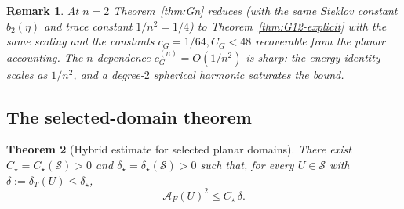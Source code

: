 \documentclass[11pt]{amsart}
\newtheorem{theorem}{Theorem}[section]
\newtheorem{remark}[theorem]{Remark}
\newcommand{\dT}{\delta_T}
\newcommand{\AF}{\mathcal A_F}
\newcommand{\Sclass}{\mathcal S}
\begin{document}
\begin{remark}\label{rem:Gn-pln}
At $n=2$ Theorem~\ref{thm:Gn} reduces (with the same Steklov
constant $b_2(\eta)$ and trace constant $1/n^2=1/4$) to
Theorem~\ref{thm:G12-explicit} with the same scaling and the
constants $c_G=1/64,C_G<48$ recoverable from the planar accounting.
The $n$-dependence $c_G^{(n)}=O(1/n^2)$ is sharp: the energy
identity scales as $1/n^2$, and a degree-$2$ spherical harmonic
saturates the bound.
\end{remark}

\subsection{The selected-domain theorem}\label{sec:selected-domain}

\begin{theorem}[Hybrid estimate for selected planar domains]
\label{thm:selected}
There exist \(C_\star=C_\star(\Sclass)>0\) and
\(\delta_\star=\delta_\star(\Sclass)>0\) such that, for every
\(U\in\Sclass\) with \(\delta:=\dT(U)\le\delta_\star\),
\begin{equation}\label{eq:selected-final}
   \AF(U)^2\le C_\star\,\delta.
\end{equation}
\end{theorem}
\end{document}
